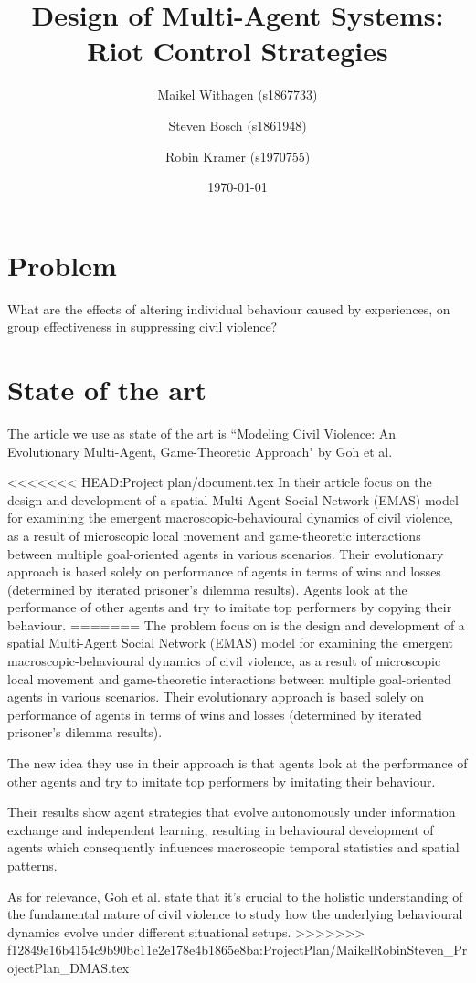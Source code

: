 \documentclass[11pt,a4paper]{article}
\title{Design of Multi-Agent Systems: Riot Control Strategies}
\author{Maikel Withagen (s1867733) \and Steven Bosch (s1861948) \and Robin Kramer (s1970755)}
\date{\today}
\begin{document}
	\maketitle
	
	\section{Problem}
		What are the effects of altering individual behaviour caused by experiences, on group effectiveness in suppressing civil violence?
		
	\section{State of the art}
		The article we use as state of the art is ``Modeling Civil Violence: An Evolutionary Multi-Agent, Game-Theoretic Approach" by Goh et al.
		
<<<<<<< HEAD:Project plan/document.tex
		In their article \citet{Goh} focus on the design and development of a spatial Multi-Agent Social Network (EMAS) model for examining the emergent macroscopic-behavioural dynamics of civil violence, as a result of microscopic local movement and game-theoretic interactions between multiple goal-oriented agents in various scenarios. Their evolutionary approach is based solely on performance of agents in terms of wins and losses (determined by iterated prisoner's dilemma results). Agents look at the performance of other agents and try to imitate top performers by copying their behaviour. 
=======
		The problem \citet{Goh} focus on is the design and development of a spatial Multi-Agent Social Network (EMAS) model for examining the emergent macroscopic-behavioural dynamics of civil violence, as a result of microscopic local movement and game-theoretic interactions between multiple goal-oriented agents in various scenarios. Their evolutionary approach is based solely on performance of agents in terms of wins and losses (determined by iterated prisoner's dilemma results). 
		
		The new idea they use in their approach is that agents look at the performance of other agents and try to imitate top performers by imitating their behaviour. 
		
		Their results show agent strategies that evolve autonomously under information exchange and independent learning, resulting in behavioural development of agents which consequently influences macroscopic temporal statistics and spatial patterns.
		
		As for relevance, Goh et al. state that it's crucial to the holistic understanding of the fundamental nature of civil violence to study how the underlying behavioural dynamics evolve under different situational setups.
>>>>>>> f12849e16b4154c9b90bc11e2e178e4b1865e8ba:ProjectPlan/MaikelRobinSteven_ProjectPlan_DMAS.tex
		
\end{document}
